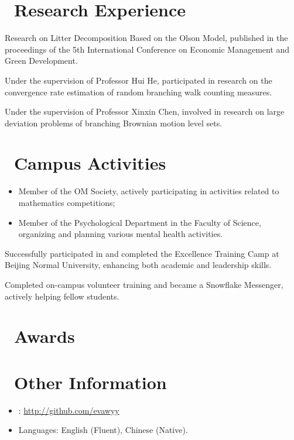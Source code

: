 \documentclass{resume}
\begin{document}
\section{\faLightbulbO\ Research Experience}
Research on Litter Decomposition Based on the Olson Model, published in the proceedings of the 5th International Conference on Economic Management and Green Development.

Under the supervision of Professor Hui He, participated in research on the convergence rate estimation of random branching walk counting measures.

Under the supervision of Professor Xinxin Chen, involved in research on large deviation problems of branching Brownian motion level sets.

\section{\faBell\ Campus Activities}
\begin{itemize}
	\item Member of the OM Society, actively participating in activities related to mathematics competitions;
	\item Member of the Psychological Department in the Faculty of Science, organizing and planning various mental health activities.
\end{itemize}

Successfully participated in and completed the Excellence Training Camp at Beijing Normal University, enhancing both academic and leadership skills.

Completed on-campus volunteer training and became a Snowflake Messenger, actively helping fellow students.

\section{\faHeartO\ Awards}

\section{\faInfo\ Other Information}
\begin{itemize}[parsep=0.5ex]
	\item \faGithub: \href{http://github.com/evawyy}{http://github.com/evawyy}
	\item Languages: English (Fluent), Chinese (Native).
\end{itemize}

%
%
\end{document}

